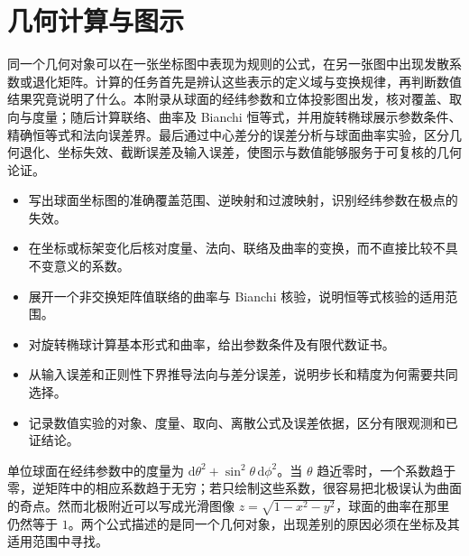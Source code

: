 
% 
% 
% 
% 
% 
% 

\chapter{几何计算与图示}
\label{g1:app:C}

\begin{chapterabstract}
	同一个几何对象可以在一张坐标图中表现为规则的公式，在另一张图中出现发散系数或退化矩阵。计算的任务首先是辨认这些表示的定义域与变换规律，再判断数值结果究竟说明了什么。本附录从球面的经纬参数和立体投影图出发，核对覆盖、取向与度量；随后计算联络、曲率及 Bianchi 恒等式，并用旋转椭球展示参数条件、精确恒等式和法向误差界。最后通过中心差分的误差分析与球面曲率实验，区分几何退化、坐标失效、截断误差及输入误差，使图示与数值能够服务于可复核的几何论证。
\end{chapterabstract}

\begin{learninggoals}
	\begin{itemize}
		\item 写出球面坐标图的准确覆盖范围、逆映射和过渡映射，识别经纬参数在极点的失效。
		\item 在坐标或标架变化后核对度量、法向、联络及曲率的变换，而不直接比较不具不变意义的系数。
		\item 展开一个非交换矩阵值联络的曲率与 Bianchi 核验，说明恒等式核验的适用范围。
		\item 对旋转椭球计算基本形式和曲率，给出参数条件及有限代数证书。
		\item 从输入误差和正则性下界推导法向与差分误差，说明步长和精度为何需要共同选择。
		\item 记录数值实验的对象、度量、取向、离散公式及误差依据，区分有限观测和已证结论。
	\end{itemize}
\end{learninggoals}

单位球面在经纬参数中的度量为 \(\mathrm{d}\theta^2+\sin^2\theta\,\mathrm{d}\phi^2\)。当 \(\theta\) 趋近零时，一个系数趋于零，逆矩阵中的相应系数趋于无穷；若只绘制这些系数，很容易把北极误认为曲面的奇点。然而北极附近可以写成光滑图像 \(z=\sqrt{1-x^2-y^2}\)，球面的曲率在那里仍然等于 \(1\)。两个公式描述的是同一个几何对象，出现差别的原因必须在坐标及其适用范围中寻找。


